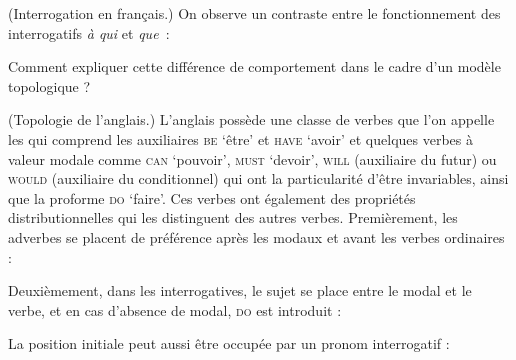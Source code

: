 {     (Interrogation en français.) On observe un contraste entre le fonctionnement des interrogatifs \textit{à qui} et \textit{que~}:
    
    \begin{exe}
    \sn
    \begin{xlista}
    \end{xlista}
    \end{exe}
    Comment expliquer cette différence de comportement dans le cadre d’un modèle topologique ?

     (Topologie de l’anglais.) L’anglais possède une classe de verbes que l’on appelle les  qui comprend les auxiliaires \textsc{be} ‘être’ et \textsc{have} ‘avoir’ et quelques verbes à valeur modale comme \textsc{can} ‘pouvoir’, \textsc{must} ‘devoir’, \textsc{will} (auxiliaire du futur) ou \textsc{would} (auxiliaire du conditionnel) qui ont la particularité d’être invariables, ainsi que la proforme \textsc{do} ‘faire’. Ces verbes ont également des propriétés distributionnelles qui les distinguent des autres verbes. Premièrement, les adverbes se placent de préférence après les modaux et avant les verbes ordinaires :
    
    \begin{exe}
    \begin{xlista}
    \end{xlista}
    \end{exe}

    Deuxièmement, dans les interrogatives, le sujet se place entre le modal et le verbe, et en cas d’absence de modal, \textsc{do} est introduit :
    
    \begin{exe}
    \begin{xlista}
    \end{xlista}
    \end{exe}
    La position initiale peut aussi être occupée par un pronom interrogatif :
    
}
